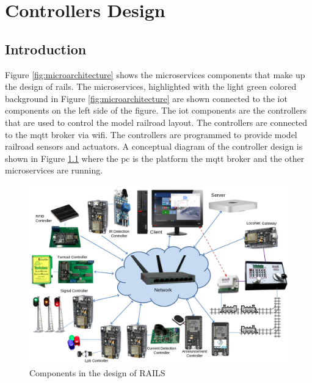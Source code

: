 \chapter{Controllers Design}
\label{chap:controllers-design}
\section{Introduction}
\label{sec:introduction}
Figure \ref{fig:microarchitecture} shows the microservices components that make up the design of \gls{rails}. The microservices,
highlighted with the light green colored background in Figure \ref{fig:microarchitecture} are shown connected to the \gls{iot} components on the left side of the figure.
The \gls{iot} components are the controllers that are used to control the model railroad layout. The controllers are connected to the \gls{mqtt} broker via \gls{wifi}. 
The controllers are programmed to provide model railroad sensors and actuators. A conceptual diagram of the controller design is shown in Figure 
\ref{fig:system-concept} where the \gls{pc} is the platform the \gls{mqtt} broker and the other microservices are running.
\begin{figure}[htbp]
    \centering
    \includegraphics[scale=0.2]{../Images/system-concept.png}
    \caption{Components in the design of RAILS}
    \label{fig:system-concept}
\end{figure}

